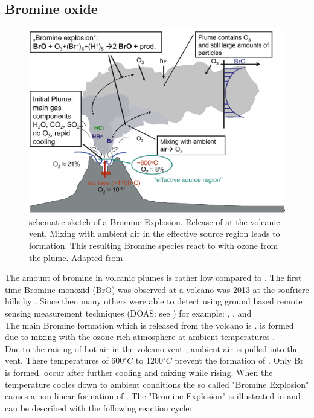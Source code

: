\documentclass  [
  paper    = a4,
  BCOR     = 10mm,
  twoside,
  fontsize = 12pt,
  fleqn,
  toc      = bibnumbered,
  toc      = listofnumbered,
  numbers  = noendperiod,
  headings = normal,
  listof   = leveldown,
  version  = 3.03
]                                       {scrreprt}
\begin{document}
\subsection{Bromine oxide}
\begin{figure}
	\centering
	\includegraphics[width=0.8\linewidth]{Bilder/Simon/Bilder_Tung/BrO_Plume}
	\caption{schematic sketch of a Bromine Explosion.
		Release of  at the volcanic vent. Mixing with ambient air in the effective source region leads to  formation. This resulting Bromine species react to  with ozone from the plume. Adapted from \cite{bobrowski2007reactive}}
	\label{fig:broplume}
\end{figure}
The amount of bromine in volcanic plumes is rather low compared to . The first time Bromine monoxid (BrO) was observed at a volcano was 2013 at the soufriere hills by \cite{bobrowski2003detection}. Since then many others were able to detect   using ground based remote sensing measurement techniques (DOAS: see ) for example:
\citet{bobrowski2007so2}, \citet{bobrowski2007reactive},\citet{vogel2011volcanic} and \cite{lubcke2014bro}
\\
The main Bromine formation which is released from the volcano is  .   is formed due to mixing with the ozone rich atmosphere at ambient temperatures \cite{bobrowski2007reactive}.\\
Due to the raising of hot air in the volcano vent , ambient air is pulled into the vent. There temperatures of  600$^{\circ}C$ to 1200$^{\circ}C$    prevent the formation of . Only Br is formed.   occur after further cooling and mixing while rising. When the temperature cooles down to ambient conditions the so called "Bromine Explosion" causes a non linear formation of .
The "Bromine Explosion" is illustrated in  and can be described with the following reaction cycle:
\end{document}
